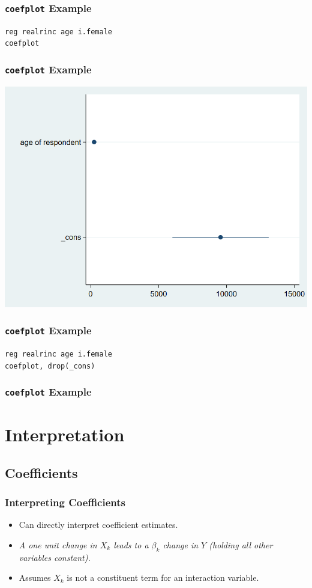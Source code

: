 \documentclass{beamer}
\begin{document}
\begin{frame}
	\frametitle{\texttt{coefplot} Example}
		\texttt{reg realrinc age i.female}\\
		\texttt{coefplot}
\end{frame}

\begin{frame}
	\frametitle{\texttt{coefplot} Example}
		\includegraphics[scale=0.3]{coefplot.png}
\end{frame}

\begin{frame}
	\frametitle{\texttt{coefplot} Example}
		\texttt{reg realrinc age i.female}\\
		\texttt{coefplot, drop(\_cons)}
\end{frame}

\begin{frame}
	\frametitle{\texttt{coefplot} Example}
\end{frame}

\section{Interpretation}
\subsection{Coefficients}

\begin{frame}
	\frametitle{Interpreting Coefficients}
		\begin{itemize}
			\item Can directly interpret coefficient estimates.
			\item \textit{A one unit change in $X_{k}$ leads to a $\beta_{k}$ change in $Y$ (holding all other variables constant).}
			\item Assumes $X_{k}$ is not a constituent term for an interaction variable. 
		\end{itemize}
\end{frame}
\end{document}
